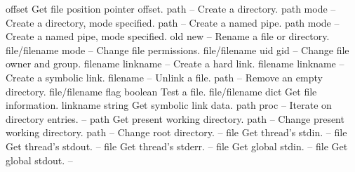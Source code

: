 \begin{longtable}{}
	{offset}
	{Get file position pointer offset.}
\hline
\optableent
	{path}
	{{\bf {}}}
	{--}
	{Create a directory.}
\optableent
	{path mode}
	{{\bf {}}}
	{--}
	{Create a directory, mode specified.}
\hline
\optableent
	{path}
	{{\bf {}}}
	{--}
	{Create a named pipe.}
\optableent
	{path mode}
	{{\bf {}}}
	{--}
	{Create a named pipe, mode specified.}
\hline
\optableent
	{old new}
	{{\bf {}}}
	{--}
	{Rename a file or directory.}
\hline
\optableent
	{file/filename mode}
	{{\bf {}}}
	{--}
	{Change file permissions.}
\hline
\optableent
	{file/filename uid gid}
	{{\bf {}}}
	{--}
	{Change file owner and group.}
\hline
\optableent
	{filename linkname}
	{{\bf {}}}
	{--}
	{Create a hard link.}
\hline
\optableent
	{filename linkname}
	{{\bf {}}}
	{--}
	{Create a symbolic link.}
\hline
\optableent
	{filename}
	{{\bf {}}}
	{--}
	{Unlink a file.}
\hline
\optableent
	{path}
	{{\bf {}}}
	{--}
	{Remove an empty directory.}
\hline
\optableent
	{file/filename flag}
	{{\bf {}}}
	{boolean}
	{Test a file.}
\hline
\optableent
	{file/filename}
	{{\bf {}}}
	{dict}
	{Get file information.}
\hline
\optableent
	{linkname}
	{{\bf {}}}
	{string}
	{Get symbolic link data.}
\hline
\optableent
	{path proc}
	{{\bf {}}}
	{--}
	{Iterate on directory entries.}
\hline
\optableent
	{--}
	{{\bf {}}}
	{path}
	{Get present working directory.}
\hline
\optableent
	{path}
	{{\bf {}}}
	{--}
	{Change present working directory.}
\hline
\optableent
	{path}
	{{\bf {}}}
	{--}
	{Change root directory.}
\hline
\optableent
	{--}
	{{\bf {}}}
	{file}
	{Get thread's stdin.}
\hline
\optableent
	{--}
	{{\bf {}}}
	{file}
	{Get thread's stdout.}
\hline
\optableent
	{--}
	{{\bf {}}}
	{file}
	{Get thread's stderr.}
\hline
\optableent
	{--}
	{{\bf {}}}
	{file}
	{Get global stdin.}
\hline
\optableent
	{--}
	{{\bf {}}}
	{file}
	{Get global stdout.}
\hline
\optableent
	{--}
	{{\bf {}}}

\end{longtable}
